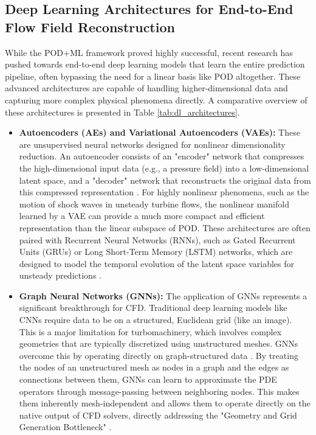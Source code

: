 \documentclass[dsc, EN]{ufabcFHZh}
\begin{document}
\subsection{Deep Learning Architectures for End-to-End Flow Field Reconstruction}

While the POD+ML framework proved highly successful, recent research has pushed towards end-to-end deep learning models that learn the entire prediction pipeline, often bypassing the need for a linear basis like POD altogether. These advanced architectures are capable of handling higher-dimensional data and capturing more complex physical phenomena directly. A comparative overview of these architectures is presented in Table \ref{tab:dl_architectures}.

\begin{itemize}
    \item \textbf{Autoencoders (AEs) and Variational Autoencoders (VAEs):} These are unsupervised neural networks designed for nonlinear dimensionality reduction. An autoencoder consists of an "encoder" network that compresses the high-dimensional input data (e.g., a pressure field) into a low-dimensional latent space, and a "decoder" network that reconstructs the original data from this compressed representation \citep{synthesized2024}. For highly nonlinear phenomena, such as the motion of shock waves in unsteady turbine flows, the nonlinear manifold learned by a VAE can provide a much more compact and efficient representation than the linear subspace of POD. These architectures are often paired with Recurrent Neural Networks (RNNs), such as Gated Recurrent Units (GRUs) or Long Short-Term Memory (LSTM) networks, which are designed to model the temporal evolution of the latent space variables for unsteady predictions \citep{synthesized2024}.
    \item \textbf{Graph Neural Networks (GNNs):} The application of GNNs represents a significant breakthrough for CFD. Traditional deep learning models like CNNs require data to be on a structured, Euclidean grid (like an image). This is a major limitation for turbomachinery, which involves complex geometries that are typically discretized using unstructured meshes. GNNs overcome this by operating directly on graph-structured data \citep{pfaff2020learning, lino2022multi}. By treating the nodes of an unstructured mesh as nodes in a graph and the edges as connections between them, GNNs can learn to approximate the PDE operators through message-passing between neighboring nodes. This makes them inherently mesh-independent and allows them to operate directly on the native output of CFD solvers, directly addressing the "Geometry and Grid Generation Bottleneck" \citep{synthesized2024}.

\end{itemize}
\end{document}
